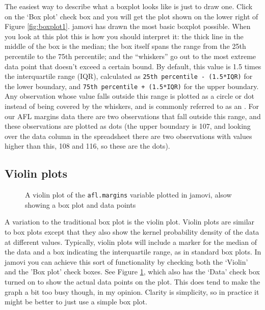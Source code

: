 The easiest way to describe what a boxplot looks like is just to draw one. Click on the `Box plot' check box and you will get the plot shown on the lower right of Figure \ref{fig:boxplot1}. jamovi has drawn the most basic boxplot possible. When you look at this plot this is how you should interpret it: the thick line in the middle of the box is the median; the box itself spans the range from the 25th percentile to the 75th percentile; and the ``whiskers'' go out to the most extreme data point that doesn't exceed a certain bound. By default, this value is 1.5 times the interquartile range (IQR), calculated as \texttt{25th percentile - (1.5*IQR)} for the lower boundary, and \texttt{75th percentile + (1.5*IQR)} for the upper boundary. Any observation whose value falls outside this range is plotted as a circle or dot instead of being covered by the whiskers, and is commonly referred to as an . For our AFL margins data there are two observations that fall outside this range, and these observations are plotted as dots (the upper boundary is 107, and looking over the data column in the spreadsheet there are two observations with values higher than this, 108 and 116, so these are the dots). 

\subsection{Violin plots~\label{sec:violinplots}}

\begin{figure}[!!htb]
\begin{center}
\caption{A violin plot of the \texttt{afl.margins} variable plotted in jamovi, alsow showing a box plot and data points}
\label{fig:boxplot2}
\end{center}
\end{figure}

A variation to the traditional box plot is the violin plot. Violin plots are similar to box plots except that they also show the kernel probability density of the data at different values. Typically, violin plots will include a marker for the median of the data and a box indicating the interquartile range, as in standard box plots. In jamovi you can achieve this sort of functionality by checking both the `Violin' and the 'Box plot' check boxes. See Figure \ref{fig:boxplot2}, which also has the `Data' check box turned on to show the actual data points on the plot. This does tend to make the graph a bit too busy though, in my opinion. Clarity is simplicity, so in practice it might be better to just use a simple box plot.

